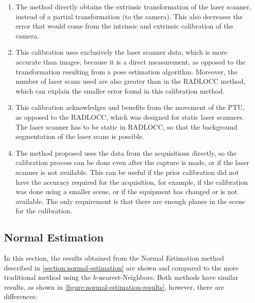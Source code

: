 \begin{enumerate}
    \item The method directly obtains the extrinsic transformation of the laser scanner, instead of a partial transformation (to the camera). This also decreases the error that would come from the intrinsic and extrinsic calibration of the camera.
    \item This calibration uses exclusively the laser scanner data, which is more accurate than images, because it is a direct measurement, as opposed to the transformation resulting from a pose estimation algorithm. Moreover, the number of laser scans used are also greater than in the RADLOCC method, which can explain the smaller error found in this calibration method.
    \item This calibration acknowledges and benefits from the movement of the PTU, as opposed to the RADLOCC, which was designed for static laser scanners. The laser scanner has to be static in RADLOCC, so that the background segmentation of the laser scans is possible.
    \item The method proposed uses the data from the acquisitions directly, so the calibration process can be done even after the capture is made, or if the laser scanner is not available. This can be useful if the prior calibration did not have the accuracy required for the acquisition, for example, if the calibration was done using a smaller scene, or if the equipment has changed or is not available. The only requirement is that there are enough planes in the scene for the calibration.
\end{enumerate}

\subsection{Normal Estimation}
\label{section:results-normal-estimation}

In this section, the results obtained from the Normal Estimation method described in \cref{section:normal-estimation} are shown and compared to the more traditional method using the $k$-nearest-Neighbors. Both methods have similar results, as shown in \cref{figure:normal-estimation-results}, however, there are differences:

